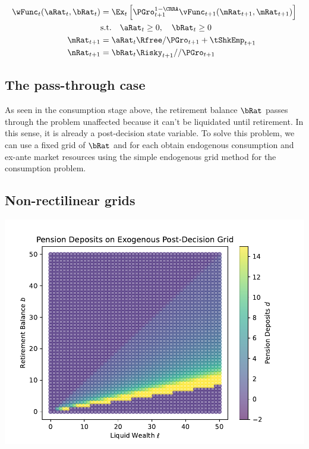 \documentclass[\econtexRoot/SequentialEGM]{subfiles}
\begin{document}
\begin{equation}
  \begin{split}
    \wFunc_{t}(\aRat_{t}, \bRat_{t}) & = \Ex_{t} \left[ \PGro_{t+1}^{1-\CRRA} \vFunc_{t+1}(\mRat_{t+1}, \mRat_{t+1}) \right] \\
    & \text{s.t.} \quad \aRat_{t} \ge 0, \quad \bRat_{t} \ge 0 \\
    \mRat_{t+1} & = \aRat_{t} \Rfree / \PGro_{t+1}  + \tShkEmp_{t+1} \\
    \nRat_{t+1} & = \bRat_{t} \Risky_{t+1} / / \PGro_{t+1}
  \end{split}
\end{equation}

\subsection{The pass-through case}

As seen in the consumption stage above, the retirement balance $\bRat$ passes through the problem unaffected because it can't be liquidated until retirement. In this sense, it is already a post-decision state variable. To solve this problem, we can use a fixed grid of $\bRat$ and for each obtain endogenous consumption and ex-ante market resources using the simple endogenous grid method for the consumption problem.

\subsection{Non-rectilinear grids}

\includegraphics[width=\textwidth]{Figures/ExogenousGrid.pdf}
\end{document}
